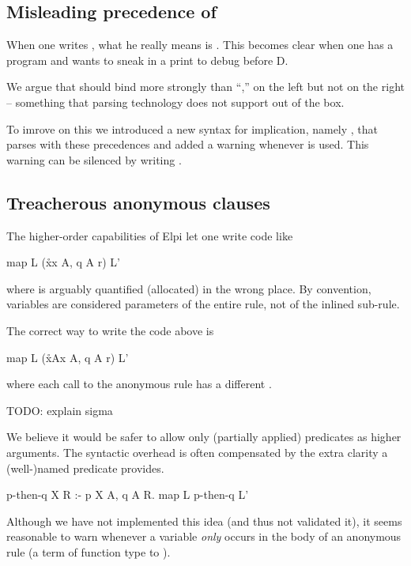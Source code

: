 \documentclass[a4paper, 11pt]{book}
\begin{document}
\subsection{Misleading precedence of \elpi{=>}}

When one writes , what he really means is .
This
becomes clear when one has a program  and wants to sneak in a
print to debug before D.

We argue that \elpi{=>} should bind more strongly than ``,'' on the left but
not on the right -- something that parsing technology does not support out of the
box. 

To imrove on this we introduced a new syntax for implication, namely \elpi{==>},
that parses with these precedences and added a
warning whenever  is used. This warning can be silenced by
writing .

\subsection{Treacherous anonymous clauses}

The higher-order capabilities of Elpi let one write code like
\begin{elpicode}
map L (x\r\p x A, q A r) L'
\end{elpicode}
where  is arguably quantified (allocated) in the wrong place. By
convention, variables are considered parameters of the entire rule, not of the
inlined sub-rule.

The correct way to write the code above is
\begin{elpicode}
map L (x\r\sigma A\p x A, q A r) L'
\end{elpicode}
where each call to the anonymous rule has a different .

TODO: explain sigma

We believe it would be safer to allow only (partially applied) predicates as
higher arguments. The syntactic overhead is often compensated by the extra
clarity a (well-)named predicate provides.

\begin{elpicode}
p-then-q X R :- p X A, q A R.
map L p-then-q L'
\end{elpicode}

Although we have not implemented this idea (and thus not validated it), it
seems reasonable to warn whenever a variable \emph{only} occurs in the body of
an anonymous rule (a term of function type to ).
\end{document}
